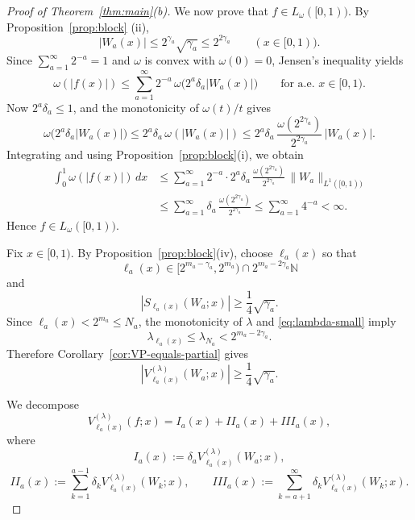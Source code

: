 \documentclass[11pt]{amsart}
\numberwithin{equation}{section}
\theoremstyle{plain}
\begin{document}
\begin{proof}[Proof of Theorem~\protect\ref{thm:main}(b)]
We now prove that $f\in L_{\omega}([0,1))$. By Proposition~\ref{prop:block}%
(ii), 
\begin{equation*}
|W_a(x)|\le 2^{\gamma_a}\sqrt{\gamma_a}\le 2^{2\gamma_a} \qquad (x\in[0,1)).
\end{equation*}
Since $\sum_{a=1}^{\infty} 2^{-a}=1$ and $\omega$ is convex with $%
\omega(0)=0 $, Jensen's inequality yields 
\begin{equation*}
\omega(|f(x)|)\le \sum_{a=1}^{\infty} 2^{-a}\,\omega\bigl(2^a\delta_a
|W_a(x)|\bigr) \qquad \text{for a.e. }x\in[0,1).
\end{equation*}
Now $2^a\delta_a\le1$, and the monotonicity of $\omega(t)/t$ gives 
\begin{equation*}
\omega\bigl(2^a\delta_a |W_a(x)|\bigr) \le 2^a\delta_a\,\omega(|W_a(x)|) \le
2^a\delta_a\,\frac{\omega(2^{2\gamma_a})}{2^{2\gamma_a}}\,|W_a(x)|.
\end{equation*}
Integrating and using Proposition~\ref{prop:block}(i), we obtain 
\begin{align*}
\int_0^1 \omega(|f(x)|)\,dx &\le \sum_{a=1}^{\infty} 2^{-a}\cdot
2^a\delta_a\,\frac{\omega(2^{2\gamma_a})}{2^{2\gamma_a}}\,\|W_a%
\|_{L^{1}([0,1))} \\
&\le \sum_{a=1}^{\infty} \delta_a\,\frac{\omega(2^{2\gamma_a})}{2^{2\gamma_a}%
} \le \sum_{a=1}^{\infty} 4^{-a}<\infty.
\end{align*}
Hence $f\in L_{\omega}([0,1))$.

Fix $x\in[0,1)$. By Proposition~\ref{prop:block}(iv), choose $\ell_a(x)$ so
that 
\begin{equation*}
\ell_a(x)\in [2^{m_a-\gamma_a},2^{m_a})\cap 2^{m_a-2\gamma_a}\mathbb{N}
\end{equation*}
and 
\begin{equation*}
|S_{\ell_a(x)}(W_a;x)|\ge \frac14\sqrt{\gamma_a}.
\end{equation*}
Since $\ell_a(x)<2^{m_a}\le N_a$, the monotonicity of $\lambda$ and %
\eqref{eq:lambda-small} imply 
\begin{equation*}
\lambda_{\ell_a(x)}\le \lambda_{N_a}<2^{m_a-2\gamma_a}.
\end{equation*}
Therefore Corollary~\ref{cor:VP-equals-partial} gives 
\begin{equation}  \label{eq:Wa-large}
|V_{\ell_a(x)}^{(\lambda)}(W_a;x)|\ge \frac14\sqrt{\gamma_a}.
\end{equation}

We decompose 
\begin{equation*}
V_{\ell_a(x)}^{(\lambda)}(f;x)=I_a(x)+II_a(x)+III_a(x),
\end{equation*}
where 
\begin{equation*}
I_a(x):=\delta_a V_{\ell_a(x)}^{(\lambda)}(W_a;x),
\end{equation*}
\begin{equation*}
II_a(x):=\sum_{k=1}^{a-1} \delta_k V_{\ell_a(x)}^{(\lambda)}(W_k;x), \qquad
III_a(x):=\sum_{k=a+1}^{\infty} \delta_k V_{\ell_a(x)}^{(\lambda)}(W_k;x).
\end{equation*}


\end{proof}
\end{document}

